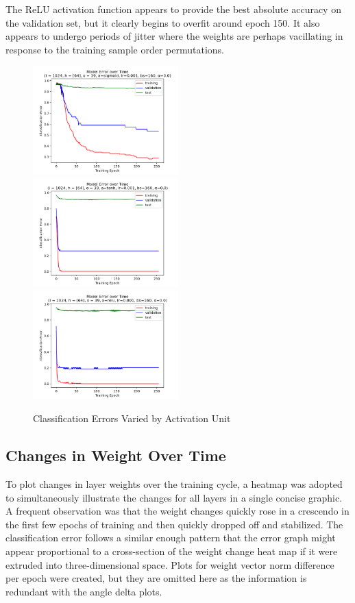 \documentclass[10pt,epsf]{article}
\begin{document}
{{{      The ReLU activation function appears to provide the best absolute accuracy on the
      validation set, but it clearly begins to overfit around epoch 150. It also appears
      to undergo periods of jitter where the weights are perhaps vacillating in response
      to the training sample order permutations.
    }
    \begin{figure}[H]
      \includegraphics[width=0.5\textwidth]{./img/64-0.001-160-0-sigmoid-1/error-255.png}
      \includegraphics[width=0.5\textwidth]{./img/64-0.001-160-0-tanh-1/error-255.png}
      \includegraphics[width=0.5\textwidth]{./img/64-0.001-160-0-relu-1/error-255.png}
      \caption{Classification Errors Varied by Activation Unit}
      \label{fig:error-by-u}
    \end{figure}
  }
  \subsection{Changes in Weight Over Time}{
    To plot changes in layer weights over the training cycle, a heatmap was adopted to simultaneously
    illustrate the changes for all layers in a single concise graphic. A frequent  observation was
    that the weight changes quickly rose in a crescendo in the first few epochs of training and then
    quickly dropped off and stabilized. The classification error follows a similar enough pattern that
    the error graph might appear proportional to a cross-section of the weight change heat map
    if it were extruded into three-dimensional space. Plots for weight vector norm difference per epoch
    were created, but they are omitted here as the information is redundant with the angle delta plots.
}}
\end{document}
